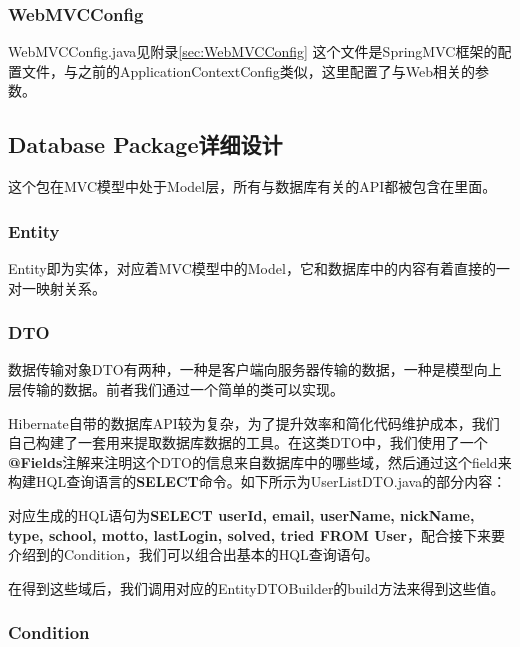 \subsubsection{WebMVCConfig}
WebMVCConfig.java见附录\ref{sec:WebMVCConfig}
这个文件是SpringMVC框架的配置文件，与之前的ApplicationContextConfig类似，这里配置了与Web相关的参数。

\subsection{Database Package详细设计}

这个包在MVC模型中处于Model层，所有与数据库有关的API都被包含在里面。

\subsubsection{Entity}

Entity即为实体，对应着MVC模型中的Model，它和数据库中的内容有着直接的一对一映射关系。

\subsubsection{DTO}

数据传输对象DTO有两种，一种是客户端向服务器传输的数据，一种是模型向上层传输的数据。前者我们通过一个简单的类可以实现。

Hibernate自带的数据库API较为复杂，为了提升效率和简化代码维护成本，我们自己构建了一套用来提取数据库数据的工具。在这类DTO中，我们使用了一个\textbf{@Fields}注解来注明这个DTO的信息来自数据库中的哪些域，然后通过这个field来构建HQL查询语言的\textbf{SELECT}命令。如下所示为UserListDTO.java的部分内容：



对应生成的HQL语句为\textbf{SELECT userId, email, userName, nickName, type, school, motto, lastLogin, solved, tried FROM User}，配合接下来要介绍到的Condition，我们可以组合出基本的HQL查询语句。

在得到这些域后，我们调用对应的EntityDTOBuilder的build方法来得到这些值。

\subsubsection{Condition}

